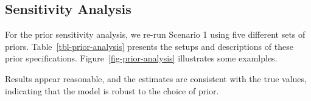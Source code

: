 \documentclass[
  letterpaper,
  double,
  12pt,
  1.0in]{beavtex}
\begin{document}
\begin{table}

\caption{\label{tbl-mar-table-s789}Results for Scenario 7-9}


\end{table}%

\subsection{Sensitivity Analysis}\label{sensitivity-analysis}

For the prior sensitivity analysis, we re-run Scenario 1 using five
different sets of priors. Table~\ref{tbl-prior-analysis} presents the
setups and descriptions of these prior specifications.
Figure~\ref{fig-prior-analysis} illustrates some examlples.

Results appear reasonable, and the estimates are consistent with the
true values, indicating that the model is robust to the choice of prior.
\end{document}
